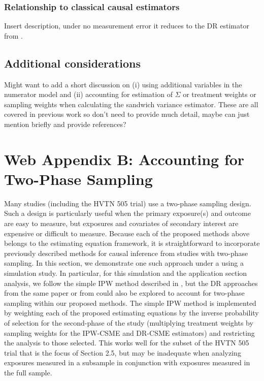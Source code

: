 \documentclass[12pt]{article}
\begin{document}
\subsubsection{Relationship to classical causal estimators}

Insert description, under no measurement error it reduces to the DR estimator from \citet{neugebauer2005}.

\subsection{Additional considerations}

Might want to add a short discussion on (i) using additional variables in the numerator model and (ii) accounting for estimation of $\Sigma$ or treatment weights or sampling weights when calculating the sandwich variance estimator. These are all covered in previous work so don't need to provide much detail, maybe can just mention briefly and provide references?

\section{Web Appendix B: Accounting for Two-Phase Sampling}

Many studies (including the HVTN 505 trial) use a two-phase sampling design. Such a design is particularly useful when the primary exposure(s) and outcome are easy to measure, but exposures and covariates of secondary interest are expensive or difficult to measure. Because each of the proposed methods above belongs to the estimating equation framework, it is straightforward to incorporate previously described methods for causal inference from studies with two-phase sampling. In this section, we demonstrate one such approach under a using a simulation study. In particular, for this simulation and the application section analysis, we follow the simple IPW method described in \citet{wang2009}, but the DR approaches from the same paper or from \citet{rose2011} could also be explored to account for two-phase sampling within our proposed methods. The simple IPW method is implemented by weighting each of the proposed estimating equations by the inverse probability of selection for the second-phase of the study (multiplying treatment weights by sampling weights for the IPW-CSME and DR-CSME estimators) and restricting the analysis to those selected. This works well for the subset of the HVTN 505 trial that is the focus of Section 2.5, but may be inadequate when analyzing exposures measured in a subsample in conjunction with exposures measured in the full sample.
\end{document}
